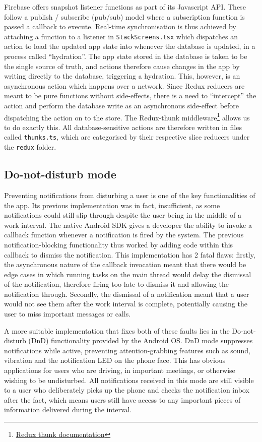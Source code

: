 Firebase offers snapshot listener functions as part of its Javascript API. These follow a publish / subscribe (pub/sub) model where a subscription function is passed a callback to execute. Real-time synchronisation is thus achieved by attaching a function to a listener in \texttt{StackScreens.tsx} which dispatches an action to load the updated app state into whenever the database is updated, in a process called ``hydration''. The app state stored in the database is taken to be the single source of truth, and actions therefore cause changes in the app by writing directly to the database, triggering a hydration. This, however, is an asynchronous action which happens over a network. Since Redux reducers are meant to be pure functions without side-effects, there is a need to ``intercept'' the action and perform the database write as an asynchronous side-effect before dispatching the action on to the store. The Redux-thunk middleware\footnote{\href{https://github.com/reduxjs/redux-thunk}{Redux thunk documentation}} allows us to do exactly this. All database-sensitive actions are therefore written in files called \texttt{thunks.ts}, which are categorised by their respective slice reducers under the \texttt{redux} folder.


\subsection{Do-not-disturb mode}
Preventing notifications from disturbing a user is one of the key functionalities of the app. Its previous implementation was in fact, insufficient, as some notifications could still slip through despite the user being in the middle of a work interval. The native Android SDK gives a developer the ability to invoke a callback function whenever a notification is fired by the system. The previous notification-blocking functionality thus worked by adding code within this callback to dismiss the notification. This implementation has 2 fatal flaws: firstly, the asynchronous nature of the callback invocation meant that there would be edge cases in which running tasks on the main thread would delay the dismissal of the notification, therefore firing too late to dismiss it and allowing the notification through. Secondly, the dismissal of a notification meant that a user would not see them after the work interval is complete, potentially causing the user to miss important messages or calls.

A more suitable implementation that fixes both of these faults lies in the Do-not-disturb (DnD) functionality provided by the Android OS. DnD mode suppresses notifications while active, preventing attention-grabbing features such as sound, vibration and the notification LED on the phone face. This has obvious applications for users who are driving, in important meetings, or otherwise wishing to be undisturbed. All notifications received in this mode are still visible to a user who deliberately picks up the phone and checks the notification inbox after the fact, which means users still have access to any important pieces of information delivered during the interval.

